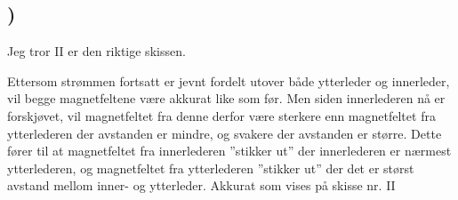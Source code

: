 \documentclass[report,12pt,norsk]{article}
\begin{document}
\subsection{)}
Jeg tror II er den riktige skissen.

Ettersom strømmen fortsatt er jevnt fordelt utover både ytterleder og innerleder, vil begge magnetfeltene være akkurat like som før. Men siden innerlederen nå er forskjøvet, vil magnetfeltet fra denne derfor være sterkere enn magnetfeltet fra ytterlederen der avstanden er mindre, og svakere der avstanden er større. Dette fører til at magnetfeltet fra innerlederen ''stikker ut'' der innerlederen er nærmest ytterlederen, og magnetfeltet fra ytterlederen ''stikker ut'' der det er størst avstand mellom inner- og ytterleder. Akkurat som vises på skisse nr. II
\end{document}
